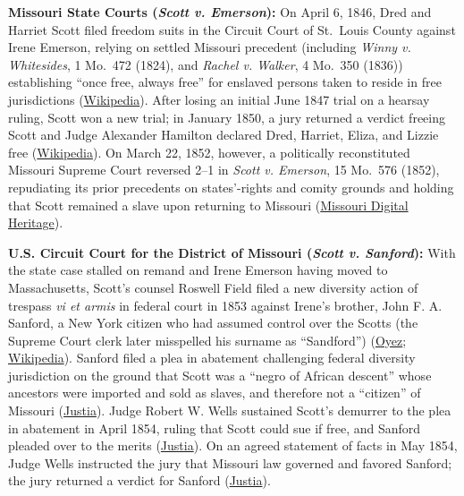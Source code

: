 \documentclass[12pt]{article}
\begin{document}
\textbf{Missouri State Courts (\textit{Scott v. Emerson}):} On April 6, 1846, Dred and Harriet Scott filed freedom suits in the Circuit Court of St.\ Louis County against Irene Emerson, relying on settled Missouri precedent (including \textit{Winny v. Whitesides}, 1 Mo.\ 472 (1824), and \textit{Rachel v. Walker}, 4 Mo.\ 350 (1836)) establishing ``once free, always free'' for enslaved persons taken to reside in free jurisdictions (\href{https://en.wikipedia.org/wiki/Dred_Scott_v._Sandford}{Wikipedia}). After losing an initial June 1847 trial on a hearsay ruling, Scott won a new trial; in January 1850, a jury returned a verdict freeing Scott and Judge Alexander Hamilton declared Dred, Harriet, Eliza, and Lizzie free (\href{https://en.wikipedia.org/wiki/Dred_Scott_v._Sandford}{Wikipedia}). On March 22, 1852, however, a politically reconstituted Missouri Supreme Court reversed 2--1 in \textit{Scott v. Emerson}, 15 Mo.\ 576 (1852), repudiating its prior precedents on states'-rights and comity grounds and holding that Scott remained a slave upon returning to Missouri (\href{https://www.sos.mo.gov/archives/resources/africanamerican/scott/scott.asp}{Missouri Digital Heritage}).

\textbf{U.S. Circuit Court for the District of Missouri (\textit{Scott v. Sanford}):} With the state case stalled on remand and Irene Emerson having moved to Massachusetts, Scott's counsel Roswell Field filed a new diversity action of trespass \textit{vi et armis} in federal court in 1853 against Irene's brother, John F. A. Sanford, a New York citizen who had assumed control over the Scotts (the Supreme Court clerk later misspelled his surname as ``Sandford'') (\href{https://www.oyez.org/cases/1850-1900/60us393}{Oyez}; \href{https://en.wikipedia.org/wiki/Dred_Scott_v._Sandford}{Wikipedia}). Sanford filed a plea in abatement challenging federal diversity jurisdiction on the ground that Scott was a ``negro of African descent'' whose ancestors were imported and sold as slaves, and therefore not a ``citizen'' of Missouri (\href{https://supreme.justia.com/cases/federal/us/60/393/}{Justia}). Judge Robert W. Wells sustained Scott's demurrer to the plea in abatement in April 1854, ruling that Scott could sue if free, and Sanford pleaded over to the merits (\href{https://supreme.justia.com/cases/federal/us/60/393/}{Justia}). On an agreed statement of facts in May 1854, Judge Wells instructed the jury that Missouri law governed and favored Sanford; the jury returned a verdict for Sanford (\href{https://supreme.justia.com/cases/federal/us/60/393/}{Justia}).
\end{document}
